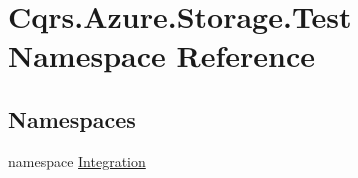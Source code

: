 \hypertarget{namespaceCqrs_1_1Azure_1_1Storage_1_1Test}{}\section{Cqrs.\+Azure.\+Storage.\+Test Namespace Reference}
\label{namespaceCqrs_1_1Azure_1_1Storage_1_1Test}
\subsection*{Namespaces}
\begin{DoxyCompactItemize}
\item 
namespace \hyperlink{namespaceCqrs_1_1Azure_1_1Storage_1_1Test_1_1Integration}{Integration}
\end{DoxyCompactItemize}
